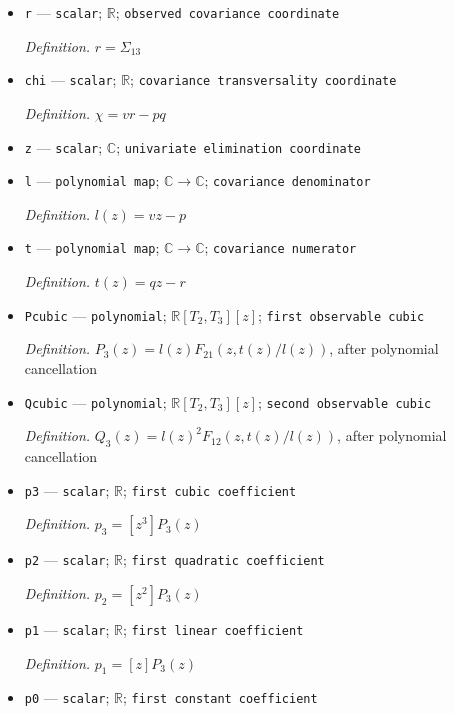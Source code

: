 \documentclass{article}
\begin{document}
\begin{itemize}
  \par\smallskip\noindent\emph{Definition.} \(q=\Sigma_{23}\)
  \item \texttt{r} --- \texttt{scalar}; \(\mathbb R\); \texttt{observed covariance coordinate}
  \par\smallskip\noindent\emph{Definition.} \(r=\Sigma_{13}\)
  \item \texttt{chi} --- \texttt{scalar}; \(\mathbb R\); \texttt{covariance transversality coordinate}
  \par\smallskip\noindent\emph{Definition.} \(\chi=vr-pq\)
  \item \texttt{z} --- \texttt{scalar}; \(\mathbb C\); \texttt{univariate elimination coordinate}
  \item \texttt{l} --- \texttt{polynomial map}; \(\mathbb C\to\mathbb C\); \texttt{covariance denominator}
  \par\smallskip\noindent\emph{Definition.} \(l(z)=vz-p\)
  \item \texttt{t} --- \texttt{polynomial map}; \(\mathbb C\to\mathbb C\); \texttt{covariance numerator}
  \par\smallskip\noindent\emph{Definition.} \(t(z)=qz-r\)
  \item \texttt{Pcubic} --- \texttt{polynomial}; \(\mathbb R[T_2,T_3][z]\); \texttt{first observable cubic}
  \par\smallskip\noindent\emph{Definition.} \(P_3(z)=l(z)F_{21}(z,t(z)/l(z))\), after polynomial cancellation
  \item \texttt{Qcubic} --- \texttt{polynomial}; \(\mathbb R[T_2,T_3][z]\); \texttt{second observable cubic}
  \par\smallskip\noindent\emph{Definition.} \(Q_3(z)=l(z)^2F_{12}(z,t(z)/l(z))\), after polynomial cancellation
  \item \texttt{p3} --- \texttt{scalar}; \(\mathbb R\); \texttt{first cubic coefficient}
  \par\smallskip\noindent\emph{Definition.} \(p_3=[z^3]P_3(z)\)
  \item \texttt{p2} --- \texttt{scalar}; \(\mathbb R\); \texttt{first quadratic coefficient}
  \par\smallskip\noindent\emph{Definition.} \(p_2=[z^2]P_3(z)\)
  \item \texttt{p1} --- \texttt{scalar}; \(\mathbb R\); \texttt{first linear coefficient}
  \par\smallskip\noindent\emph{Definition.} \(p_1=[z]P_3(z)\)
  \item \texttt{p0} --- \texttt{scalar}; \(\mathbb R\); \texttt{first constant coefficient}

\end{itemize}
\end{document}
